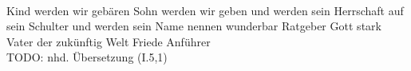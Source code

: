 \begin{exe}
\ex \label{ex:I3050} \gll {}                                       \\
{} {Kind} {werden} {wir} {gebären} {} {Sohn} {werden} {wir} {geben} {} {und} {werden} {sein} {Herrschaft} {auf} {sein } {Schulter} {} {und} {werden} {sein} {Name} {nennen} {wunderbar} {} {Ratgeber} {} {Gott} {stark} {} {Vater} {der} {zukünftig} {Welt} {} {Friede} {Anführer} {}\\
\glt TODO: nhd. Übersetzung (I.5,1)
\end{exe}
